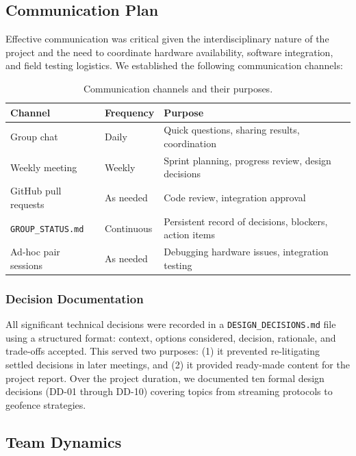 \subsection{Communication Plan}

Effective communication was critical given the interdisciplinary nature of the project and the need to coordinate hardware availability, software integration, and field testing logistics. We established the following communication channels:

\begin{table}[htbp]
\centering
\compactTable
\caption{Communication channels and their purposes.}
\label{tab:comms}
\begin{tabularx}{\linewidth}{l l X}
\toprule
\textbf{Channel} & \textbf{Frequency} & \textbf{Purpose} \\
\midrule
Group chat & Daily & Quick questions, sharing results, coordination \\
Weekly meeting & Weekly & Sprint planning, progress review, design decisions \\
GitHub pull requests & As needed & Code review, integration approval \\
\texttt{GROUP\_STATUS.md} & Continuous & Persistent record of decisions, blockers, action items \\
Ad-hoc pair sessions & As needed & Debugging hardware issues, integration testing \\
\bottomrule
\end{tabularx}
\end{table}

\subsubsection{Decision Documentation}

All significant technical decisions were recorded in a \texttt{DESIGN\_DECISIONS.md} file using a structured format: context, options considered, decision, rationale, and trade-offs accepted. This served two purposes: (1) it prevented re-litigating settled decisions in later meetings, and (2) it provided ready-made content for the project report. Over the project duration, we documented ten formal design decisions (DD-01 through DD-10) covering topics from streaming protocols to geofence strategies.

\subsection{Team Dynamics}

